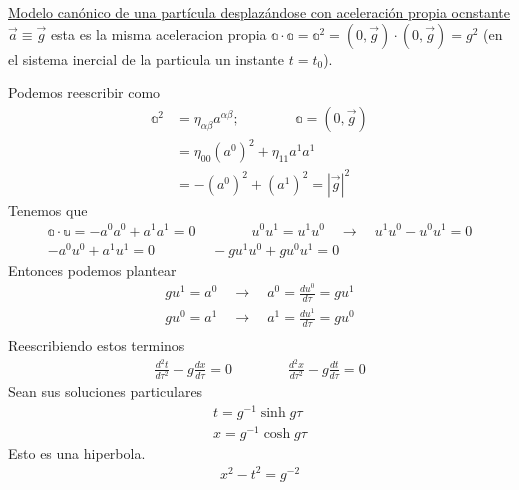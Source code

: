 \documentclass{article}
\begin{document}
\hfill 

\hfill 

\hfill 

\hfill 

\hfill 

\underline{Modelo canónico de una partícula desplazándose con aceleración propia ocnstante $ \vec a \equiv \vec g  $} esta es la misma aceleracion propia $ \mathbb a \cdot \mathbb a = \mathbb a ^ {2 } = (0,\vec g ) \cdot (0, \vec g ) = g ^ {2 } $ (en el sistema inercial de la particula un instante $ t = t_0  $).

Podemos reescribir como 
\begin{align*}
  \mathbb a ^ {2 } &= \eta _{\alpha\beta}  a ^ {\alpha\beta}; \qquad \qquad \mathbb a = (0,\vec g ) \\
  &= \eta _{00 }  (a ^ {0 } ) ^ {2 } + \eta _{11 }  a ^ {1 } a ^ {1 } \\
  &= - (a ^ {0 }) ^ {2 } + ( a ^ {1 }) ^ {2 } = \left|\vec g \right| ^ {2 }
\end{align*}
Tenemos que 
\begin{gather*}
  \mathbb a \cdot \mathbb u = - a ^ {0 } a ^ {0 } + a ^ {1 } a ^ {1 } = 0 \qquad \qquad u ^ {0 } u ^ {1 } = u ^ {1 } u ^ {0 } \quad \rightarrow \quad u ^ {1 } u ^ {0 } - u ^ {0 } u ^ {1 } = 0 \\
  - a ^ {0 } u ^ {0 } + a ^ {1 } u ^ {1 } = 0 \qquad \qquad - g u ^ {1} u ^ {0 } + g u ^ {0 } u ^ { 1 } = 0   
\end{gather*}
Entonces podemos plantear 
\begin{gather*}
   g u ^ {1 } = a ^ {0 } \quad \rightarrow \quad a ^ {0 } = \frac{d u ^ {0 } }{d \tau} = g u ^ {1 }\\
   g u ^ {0 } = a ^ {1 } \quad \rightarrow \quad a ^ {1 } = \frac{d u ^ {1 } }{d \tau} = g u ^ {0 }\\
\end{gather*}
Reescribiendo estos terminos 
\begin{gather*}
  \frac{d ^2 t  }{d \tau^2 } - g \frac{d x  }{d \tau} = 0 \qquad \qquad 
  \frac{d ^2 x  }{d \tau^2 } - g \frac{d t  }{d \tau} = 0 
\end{gather*}
Sean sus soluciones particulares 
\begin{gather*}
  t = g ^ {-1 } \sinh{g\tau} \\
  x = g ^ {-1 } \cosh{g\tau}
\end{gather*}
Esto es una hiperbola.
\begin{gather*}
  x^2 - t^2 = g ^ {-2 } 
\end{gather*}
\end{document}
